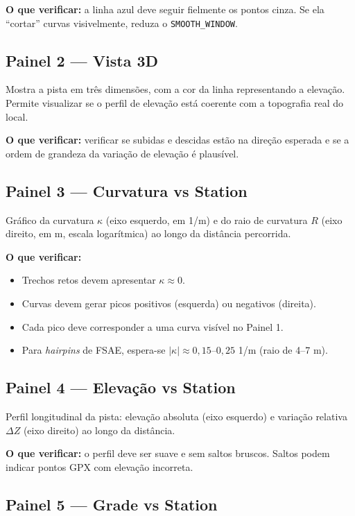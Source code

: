 \documentclass[a4paper,12pt]{article}
\begin{document}
\textbf{O que verificar:} a linha azul deve seguir fielmente os pontos cinza. Se ela ``cortar'' curvas visivelmente, reduza o \texttt{SMOOTH\_WINDOW}.

\subsection{Painel 2 --- Vista 3D}

Mostra a pista em três dimensões, com a cor da linha representando a elevação. Permite visualizar se o perfil de elevação está coerente com a topografia real do local.

\textbf{O que verificar:} verificar se subidas e descidas estão na direção esperada e se a ordem de grandeza da variação de elevação é plausível.

\subsection{Painel 3 --- Curvatura vs Station}

Gráfico da curvatura $\kappa$ (eixo esquerdo, em 1/m) e do raio de curvatura $R$ (eixo direito, em m, escala logarítmica) ao longo da distância percorrida.

\textbf{O que verificar:}
\begin{itemize}
    \item Trechos retos devem apresentar $\kappa \approx 0$.
    \item Curvas devem gerar picos positivos (esquerda) ou negativos (direita).
    \item Cada pico deve corresponder a uma curva visível no Painel 1.
    \item Para \textit{hairpins} de FSAE, espera-se $|\kappa| \approx 0{,}15$--$0{,}25$ 1/m (raio de 4--7 m).
\end{itemize}

\subsection{Painel 4 --- Elevação vs Station}

Perfil longitudinal da pista: elevação absoluta (eixo esquerdo) e variação relativa $\Delta Z$ (eixo direito) ao longo da distância.

\textbf{O que verificar:} o perfil deve ser suave e sem saltos bruscos. Saltos podem indicar pontos GPX com elevação incorreta.

\subsection{Painel 5 --- Grade vs Station}
\end{document}
